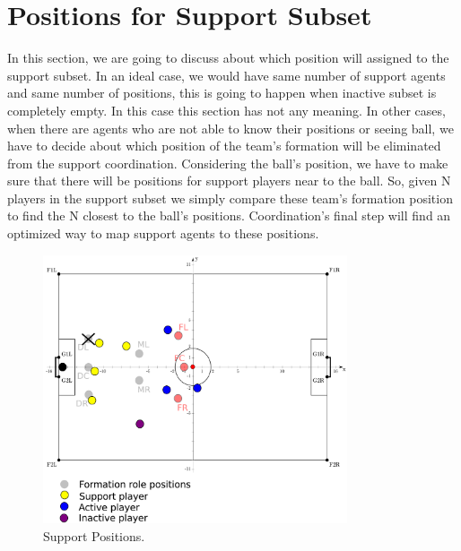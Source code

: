 \section{Positions for Support Subset}
In this section, we are going to discuss about which position will assigned to the support subset. In an ideal case, we would have same number of support agents and same number of positions, this is going to happen when inactive subset is completely empty. In this case this section has not any meaning. In other cases, when there are agents who are not able to know their positions or seeing ball, we have to decide about which position of the team's formation will be eliminated from the support coordination. Considering the ball's position, we have to make sure that there will be positions for support players near to the ball. So, given N players in the support subset we simply compare these team's formation position to find the N closest to the ball's positions. Coordination's final step will find an optimized way to map support agents to these positions.
\begin{figure}[htb!]
\centering
  \includegraphics[width=0.8\textwidth]{Chapter4/figures/SupportPos.pdf}
  \caption{Support Positions.} 
  \label{fig:SupportPos}
\end{figure}

